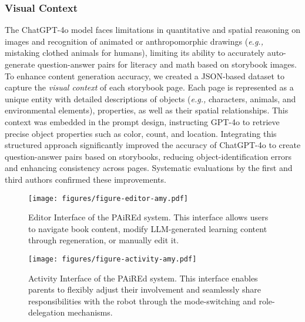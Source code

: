 \subsubsection{Visual Context} 
The ChatGPT-4o model faces limitations in quantitative and spatial reasoning on images and recognition of animated or anthropomorphic drawings (\textit{e.g.,} mistaking clothed animals for humans), limiting its ability to accurately auto-generate question-answer pairs for literacy and math based on storybook images. To enhance content generation accuracy, we created a JSON-based dataset to capture the \textit{visual context} of each storybook page. Each page is represented as a unique entity with detailed descriptions of objects (\textit{e.g.,} characters, animals, and environmental elements), properties, as well as their spatial relationships. This context was embedded in the prompt design, instructing GPT-4o to retrieve precise object properties such as color, count, and location. Integrating this structured approach significantly improved the accuracy of ChatGPT-4o to create question-answer pairs based on storybooks, reducing object-identification errors and enhancing consistency across pages. Systematic evaluations by the first and third authors confirmed these improvements.


\begin{figure*}[b!]
  \texttt{[image: figures/figure-editor-amy.pdf]}
     \caption{Editor Interface of the PAiREd system. This interface allows users to navigate book content, modify LLM-generated learning content through regeneration, or manually edit it.}
  \label{fig:editor}
\end{figure*}

\begin{figure*}[b!]
\centering
  \texttt{[image: figures/figure-activity-amy.pdf]}
  \caption{Activity Interface of the PAiREd system. This interface enables parents to flexibly adjust their involvement and seamlessly share responsibilities with the robot through the mode-switching and role-delegation mechanisms.}
  \label{fig:activity}
   \vspace{-10pt}
\end{figure*}
 
